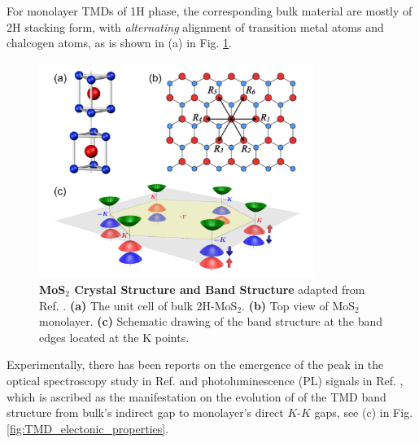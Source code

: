 

For monolayer TMDs of 1H phase, the corresponding bulk material are mostly of 2H stacking form, with \emph{alternating} alignment of transition metal atoms and chalcogen atoms, as is shown in (a) in Fig. \ref{fig:MoS2_Di}.
\begin{figure}[!htp]
    \centering
    \includegraphics[width=0.8\textwidth]{figures/MoS2_Di.png}
    \caption{\textbf{MoS$_2$ Crystal Structure and Band Structure} adapted from Ref. \cite{xiao2012coupled}. \textbf{(a)} The unit cell of bulk 2H-MoS$_2$. \textbf{(b)} Top view of MoS$_2$ monolayer. \textbf{(c)} Schematic drawing of the band structure at the band edges located at the K points.}
    \label{fig:MoS2_Di}
\end{figure}
Experimentally, there has been reports on the emergence of the peak in the optical spectroscopy study in Ref. \cite{mak2010atomically} and photoluminescence (PL) signals in Ref. \cite{splendiani2010emerging}, which is ascribed as the manifestation on the evolution of of the TMD band structure from bulk's indirect gap to monolayer's direct $K$-$K$ gaps, see (c) in Fig. \ref{fig:TMD_electonic_properties}.

